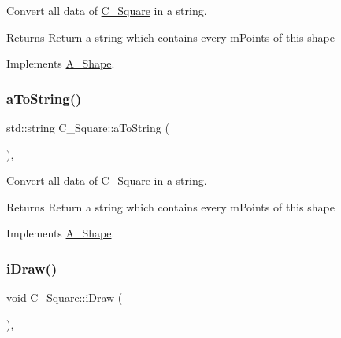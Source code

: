 Convert all data of \hyperlink{classC__Square}{C\+\_\+\+Square} in a string. 

\begin{DoxyReturn}{Returns}
Return a string which contains every m\+Points of this shape 
\end{DoxyReturn}


Implements \hyperlink{classA__Shape_ad8804b4e74543db374af6892367b7c2e}{A\+\_\+\+Shape}.

\mbox{\label{classC__Square_ab2cada51b25cd35b9a79e461767e56f0}} 
\subsubsection{\texorpdfstring{a\+To\+String()}{aToString()}\hspace{0.1cm}{\footnotesize\ttfamily [2/2]}}
{\footnotesize\ttfamily std\+::string C\+\_\+\+Square\+::a\+To\+String (\begin{DoxyParamCaption}{ }\end{DoxyParamCaption})\hspace{0.3cm}{\ttfamily [override]}, {\ttfamily [virtual]}}



Convert all data of \hyperlink{classC__Square}{C\+\_\+\+Square} in a string. 

\begin{DoxyReturn}{Returns}
Return a string which contains every m\+Points of this shape 
\end{DoxyReturn}


Implements \hyperlink{classA__Shape_ad8804b4e74543db374af6892367b7c2e}{A\+\_\+\+Shape}.

\mbox{\label{classC__Square_ae6c51a7720576bcbb94b52584552df28}} 
\subsubsection{\texorpdfstring{i\+Draw()}{iDraw()}\hspace{0.1cm}{\footnotesize\ttfamily [1/4]}}
{\footnotesize\ttfamily void C\+\_\+\+Square\+::i\+Draw (\begin{DoxyParamCaption}{ }\end{DoxyParamCaption})\hspace{0.3cm}{\ttfamily [override]}, {\ttfamily [virtual]}}



